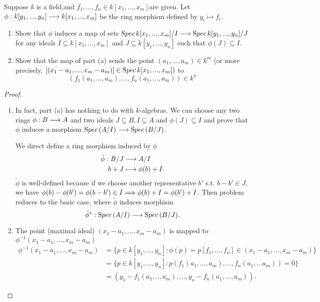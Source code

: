 \documentclass[11pt,fleqn]{book}
\begin{document}
\begin{exr}
Suppose $k$ is a field,and $f_1,...,f_n \in k[x_1,...,x_m]$are given. Let $\phi: k[y_1,...,y_n] \longrightarrow k[x_1,...,x_m]$ be the ring morphism defined by $y_i  \mapsto f_i$.
\begin{enumerate}[label=(\alph*)]
\item  Show that $\phi$ induces a map of sets ${\text Spec\,} k[x_1,...,x_m]/I \longrightarrow {\text Spec\,} k[y_1,...,y_n]/J$ for any ideals $I \subseteq k[x_1,...,x_m]$ and $J \subseteq k[y_1,...,y_n]$ such that $\phi(J) \subseteq I$. 
\item Show that the map of part (a) sends the point $(a_1,...,a_m) \in k^m$ (or more
precisely, $[(x_1 -a_1,...,x_m - a_m)] \in {\text Spec\,} k[x_1,...,x_m])$ to
$$
(f_1(a_1,...,a_m),...,f_n(a_1,...,a_m)) \in k^n
$$
\end{enumerate}
\end{exr}
\begin{proof}
\begin{enumerate}[label=(\alph*)]
\item In fact, part (a) has nothing to do with $k$-algebras. We can choose any two rings $\phi:B\longrightarrow A$ and two ideals $J\subseteq B, I\subseteq A$ and $\phi(J)\subseteq I$ and prove that $\phi$ induces a morphism ${\text Spec\,} (A/I)\longrightarrow {\text Spec\,} (B/J)$. 

We direct define a ring morphism induced by $\phi$
$$
\begin{aligned}
\tilde{\phi}:B/J&\longrightarrow A/I\\
b+J&\longmapsto \phi(b)+I.
\end{aligned}
$$
$\tilde{\phi}$ is well-defined because if we choose another representative $b'$ s.t. $b-b'\in J$, we have $\phi(b)-\phi(b')=\phi(b-b')\in I\Longrightarrow \phi(b)+I=\phi(b')+I$. Then problem reduces to the basic case, where $\tilde{\phi}$ induces morphism
$$
\tilde{\phi}^*:{\text Spec\,}(A/I)\longrightarrow {\text Spec\,} (B/J).
$$
\item The point (maximal ideal) $(x_1-a_1,...,x_m-a_m)$  is mapped to $\phi^{-1}(x_1-a_1,...,x_m-a_m)$
$$
\begin{aligned}
\phi^{-1}(x_1-a_1,...,x_m-a_m)&=\{p\in k[y_1,...,y_n]:\phi(p)=p[f_1,...,f_n]\in (x_1-a_1,...,x_m-a_m)\}\\
&=\{p\in k[y_1,...,y_n]: p\left(f_1(a_1,...,a_m),...,f_n(a_1,...a_m)\right)=0\}\\
&=(y_1-f_1(a_1,..,a_m),...,y_n-f_n(a_1,...,a_m)).
\end{aligned}
$$ 
\end{enumerate}
\end{proof}
\end{document}
